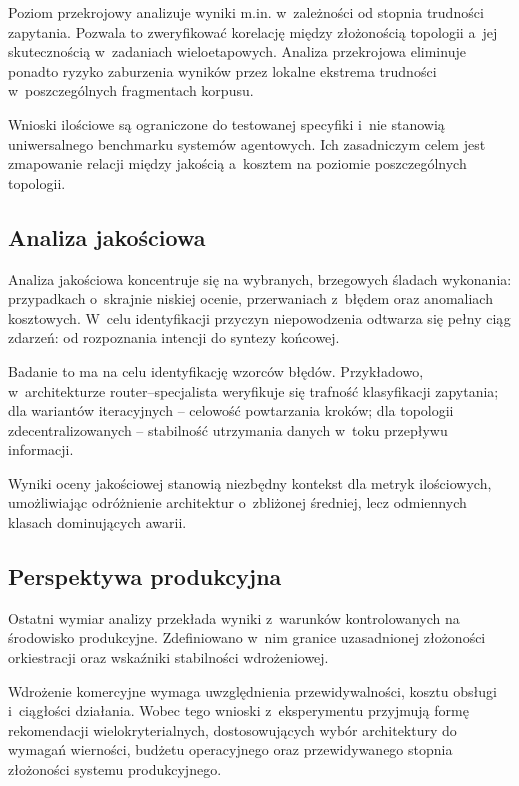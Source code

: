 Poziom przekrojowy analizuje wyniki m.in. w~zależności od stopnia trudności
zapytania. Pozwala to zweryfikować korelację między złożonością topologii a~jej
skutecznością w~zadaniach wieloetapowych. Analiza przekrojowa eliminuje ponadto
ryzyko zaburzenia wyników przez lokalne ekstrema trudności w~poszczególnych
fragmentach korpusu.

Wnioski ilościowe są ograniczone do testowanej specyfiki i~nie stanowią
uniwersalnego benchmarku systemów agentowych. Ich zasadniczym celem jest
zmapowanie relacji między jakością a~kosztem na poziomie poszczególnych
topologii.

\subsection{Analiza jakościowa}\label{subsec:analiza-jakosciowa}

Analiza jakościowa koncentruje się na wybranych, brzegowych śladach wykonania:
przypadkach o~skrajnie niskiej ocenie, przerwaniach z~błędem oraz anomaliach
kosztowych. W~celu identyfikacji przyczyn niepowodzenia odtwarza się pełny ciąg
zdarzeń: od rozpoznania intencji do syntezy końcowej.

Badanie to ma na celu identyfikację wzorców błędów. Przykładowo,
w~architekturze router--specjalista weryfikuje się trafność klasyfikacji
zapytania; dla wariantów iteracyjnych -- celowość powtarzania kroków; dla
topologii zdecentralizowanych -- stabilność utrzymania danych w~toku przepływu
informacji.

Wyniki oceny jakościowej stanowią niezbędny kontekst dla metryk ilościowych,
umożliwiając odróżnienie architektur o~zbliżonej średniej, lecz odmiennych
klasach dominujących awarii.

\subsection{Perspektywa produkcyjna}\label{subsec:perspektywa-produkcyjna}

Ostatni wymiar analizy przekłada wyniki z~warunków kontrolowanych na środowisko
produkcyjne. Zdefiniowano w~nim granice uzasadnionej złożoności orkiestracji
oraz wskaźniki stabilności wdrożeniowej.

Wdrożenie komercyjne wymaga uwzględnienia przewidywalności, kosztu obsługi
i~ciągłości działania. Wobec tego wnioski z~eksperymentu przyjmują formę
rekomendacji wielokryterialnych, dostosowujących wybór architektury do wymagań
wierności, budżetu operacyjnego oraz przewidywanego stopnia złożoności systemu
produkcyjnego.

